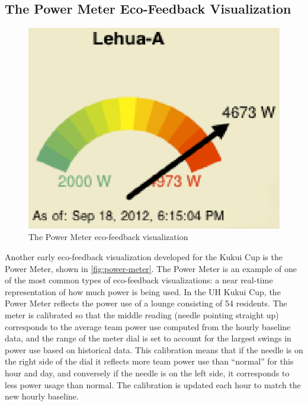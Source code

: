 \documentclass{sigchi}
\begin{document}
\subsection{The Power Meter Eco-Feedback Visualization}

\begin{figure}[!tb]
	\centering
	\includegraphics[width=0.65\columnwidth]{power-meter.eps}
	\caption{The Power Meter eco-feedback visualization}
	\label{fig:power-meter}
\end{figure}

Another early eco-feedback visualization developed for the Kukui Cup is the Power Meter, shown in \autoref{fig:power-meter}. The Power Meter is an example of one of the most common types of eco-feedback visualizations: a near real-time representation of how much power is being used. In the UH Kukui Cup, the Power Meter reflects the power use of a lounge consisting of 54 residents. The meter is calibrated so that the middle reading (needle pointing straight up) corresponds to the average team power use computed from the hourly baseline data, and the range of the meter dial is set to account for the largest swings in power use based on historical data. This calibration means that if the needle is on the right side of the dial it reflects more team power use than ``normal'' for this hour and day, and conversely if the needle is on the left side, it corresponds to less power usage than normal. The calibration is updated each hour to match the new hourly baseline.
\end{document}
